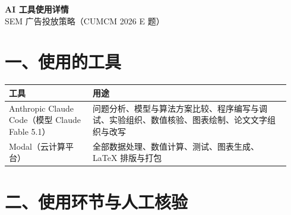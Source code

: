 \documentclass[UTF8,zihao=-4,fontset=none,a4paper]{ctexart}
\begin{document}
\begin{center}{\LARGE\bfseries AI 工具使用详情}\\[6pt]{\large SEM 广告投放策略（CUMCM 2026 E 题）}\end{center}

\section*{一、使用的工具}
\begin{longtable}{@{}p{0.28\linewidth}p{0.66\linewidth}@{}}
\toprule 工具 & 用途 \\ \midrule \endhead \bottomrule \endfoot
Anthropic Claude Code（模型 Claude Fable 5.1） & 问题分析、模型与算法方案比较、程序编写与调试、实验组织、数值核验、图表绘制、论文文字组织与改写 \\
Modal（云计算平台） & 全部数据处理、数值计算、测试、图表生成、LaTeX 排版与打包 \\
\end{longtable}

\section*{二、使用环节与人工核验}

\end{document}
